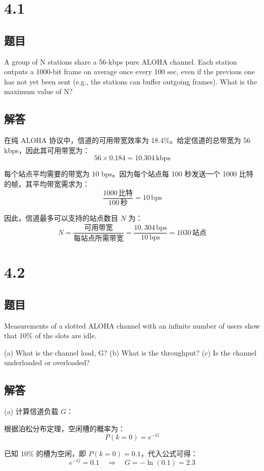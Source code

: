 \section{4.1}

\subsection*{题目}
A group of N stations share a 56-kbps pure ALOHA channel. Each station outputs a 1000-bit frame on average once every 100 sec, even if the previous one has not yet been sent (e.g., the stations can buffer outgoing frames). What is the maximum value of N?

\subsection*{解答}

在纯 ALOHA 协议中，信道的可用带宽效率为 18.4\%。给定信道的总带宽为 56 kbps，因此其可用带宽为：
\[
56 \times 0.184 = 10.304 \, \text{kbps}
\]

每个站点平均需要的带宽为 10 bps。因为每个站点每 100 秒发送一个 1000 比特的帧，其平均带宽需求为：
\[
\frac{1000 \, \text{比特}}{100 \, \text{秒}} = 10 \, \text{bps}
\]

因此，信道最多可以支持的站点数目 \(N\) 为：
\[
N = \frac{\text{可用带宽}}{\text{每站点所需带宽}} = \frac{10,304 \, \text{bps}}{10 \, \text{bps}} = 1030 \, \text{站点}
\]

\section{4.2}

\subsection*{题目}
Measurements of a slotted ALOHA channel with an infinite number of users show that 10\% of the slots are idle.

(a) What is the channel load, G?  
(b) What is the throughput?  
(c) Is the channel underloaded or overloaded?

\subsection*{解答}

(a) 计算信道负载 \(G\)：

根据泊松分布定理，空闲槽的概率为：
\[
P(k = 0) = e^{-G}
\]

已知 10\% 的槽为空闲，即 \(P(k = 0) = 0.1\)，代入公式可得：
\[
e^{-G} = 0.1 \quad \Rightarrow \quad G = -\ln(0.1) = 2.3
\]

